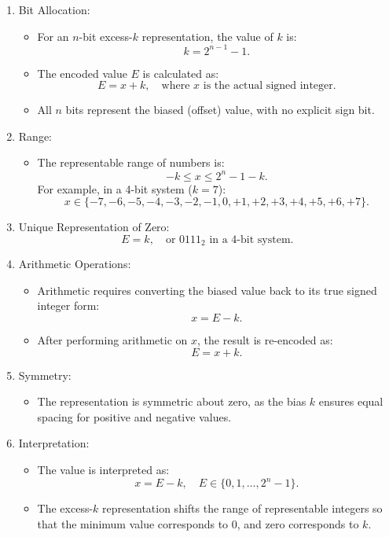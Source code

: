 \begin{enumerate}[left=1cm]
    \item Bit Allocation:
    \begin{itemize}
        \item For an \( n \)-bit excess-\( k \) representation, the value of \( k \) is:
       \[
       k = 2^{n-1} - 1.
       \]
        \item The encoded value \( E \) is calculated as:
        \[
        E = x + k, \quad \text{where } x \text{ is the actual signed integer.}
        \]
        \item All \( n \) bits represent the biased (offset) value, with no explicit sign bit.
    \end{itemize}

    \item Range:
    \begin{itemize}
        \item The representable range of numbers is:
     \[
     -k \leq x \leq 2^n - 1 - k.
     \]
     For example, in a 4-bit system (\( k = 7 \)):
     \[
     x \in \{-7, -6, -5, -4, -3, -2, -1, 0, +1, +2, +3, +4, +5, +6, +7\}.
     \]
     \end{itemize}

    \item Unique Representation of Zero:
     \[
     E = k, \quad \text{or } 0111_2 \text{ in a 4-bit system.}
     \]

    \item Arithmetic Operations:
    \begin{itemize}
        \item Arithmetic requires converting the biased value back to its true signed integer form:
        \[
        x = E - k.
        \]
        \item After performing arithmetic on \( x \), the result is re-encoded as:
        \[
        E = x + k.
        \]
    \end{itemize}

    \item Symmetry:
    \begin{itemize}
        \item The representation is symmetric about zero, as the bias \( k \) ensures equal spacing for positive and negative values.
    \end{itemize}

    \item Interpretation:
    \begin{itemize}
        \item The value is interpreted as:
        \[
        x = E - k, \quad E \in \{0, 1, \dots, 2^n - 1\}.
        \]
        \item The excess-\( k \) representation shifts the range of representable integers so that the minimum value corresponds to \( 0 \), and zero corresponds to \( k \).
    \end{itemize}
\end{enumerate}

